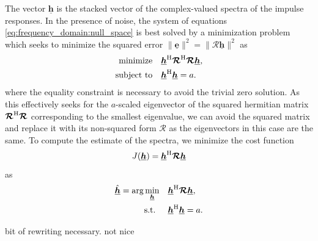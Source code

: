 \documentclass{article}
\newcommand{\hf}{\underline{\bm{h}}}
\newcommand{\Rf}{\bm{\mathcal{R}}}
\begin{document}
The vector \(\hf\) is the stacked vector of the complex-valued spectra of the impulse responses.
In the presence of noise, the system of equations \eqref{eq:frequency_domain:null_space} is best solved by a minimization problem which seeks to minimize the squared error \(\|\underline{\bm{e}} \|^2 = \| \Rf \hf \|^2\) as
\begin{align}
    \operatorname{minimize} \quad & \hf^\herm \Rf^\herm \Rf \hf, \label{eq:frequency_domain:least_squares}\\
    \text{subject to} \quad & \hf^\herm \hf = a.
\end{align}
where the equality constraint is necessary to avoid the trivial zero solution.
As this effectively seeks for the \(a\)-scaled eigenvector of the squared hermitian matrix \(\Rf^\herm \Rf\) corresponding to the smallest eigenvalue, we can avoid the squared matrix and replace it with its non-squared form \(\Rf\) as the eigenvectors in this case are the same.
To compute the estimate of the spectra, we minimize the cost function
\begin{equation}
    J(\hf) = \hf^\herm \Rf \hf\label{eq:frequency_domain:cost_function}
\end{equation}
as
\begin{align}
    \hat{\hf} = \arg \min_{\hf} \quad &\hf^\herm \Rf \hf, \label{eq:frequency_domain:min_prob}\\
    \text{s.t. } \quad &\hf^\herm \hf = a.
\end{align}
\begin{attention}
    bit of rewriting necessary. not nice
\end{attention}

\end{document}

